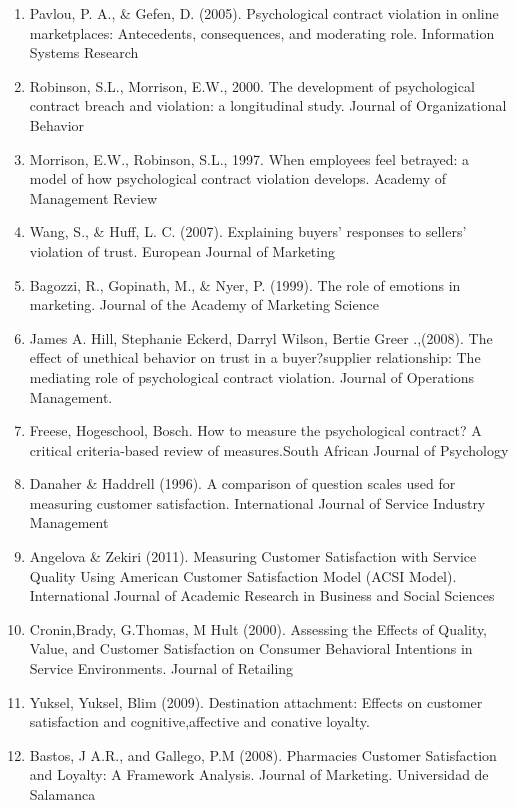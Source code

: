 \documentclass[a4paper, 14pt]{article}
\begin{document}
{\begin{enumerate}
\item Pavlou, P. A., \& Gefen, D. (2005). Psychological contract violation in online marketplaces: Antecedents, consequences, and moderating role. Information Systems Research%
\item Robinson, S.L., Morrison, E.W., 2000. The development of psychological contract breach and violation: a longitudinal study. Journal of Organizational Behavior %
\item Morrison, E.W., Robinson, S.L., 1997. When employees feel betrayed: a model of how psychological contract violation develops. Academy of Management Review%
\item Wang, S., \& Huff, L. C. (2007). Explaining buyers' responses to sellers' violation of trust. European Journal of Marketing%
\item Bagozzi, R., Gopinath, M., \& Nyer, P. (1999). The role of emotions in marketing. Journal of the Academy of Marketing Science%
\item James A. Hill, Stephanie Eckerd, Darryl Wilson, Bertie Greer .,(2008). The effect of unethical behavior on trust in a buyer?supplier relationship: The mediating role of psychological contract violation. Journal of Operations Management.%
\item Freese, Hogeschool, Bosch. How to measure the psychological contract? A critical criteria-based review of measures.South African Journal of Psychology
\item Danaher \& Haddrell (1996). A comparison of question scales used for measuring customer satisfaction. International Journal of Service Industry Management
\item  Angelova \& Zekiri (2011). Measuring Customer Satisfaction with Service Quality Using American Customer Satisfaction Model (ACSI Model). International Journal of Academic Research in Business and Social Sciences 
\item Cronin,Brady, G.Thomas, M Hult (2000). Assessing the Effects of Quality, Value, and Customer Satisfaction on Consumer Behavioral Intentions in Service Environments. Journal of Retailing 
\item Yuksel, Yuksel, Blim (2009). Destination attachment: Effects on customer satisfaction and cognitive,affective and conative loyalty.
\item Bastos, J A.R., and Gallego, P.M (2008). Pharmacies Customer Satisfaction and Loyalty: A Framework Analysis. Journal of Marketing. Universidad de Salamanca

\end{enumerate}}
\end{document}
